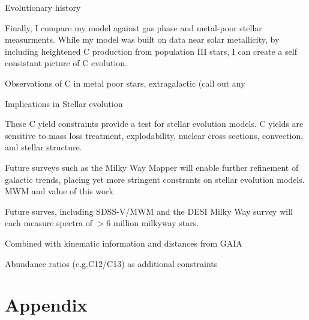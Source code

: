 \documentclass[12pt,oneside]{report}
\begin{document}
Evolutionary history

Finally, I compare my model against gas phase and metal-poor stellar measurments. While my model was built on data near solar metallicity, by including heightened C production from population III stars, I can create a self consistant picture of C evolution.

Observations of C in metal poor stars, extragalactic (call out any

Implications in Stellar evolution

These C yield constraints provide a test for stellar evolution models. C yields are sensitive to mass loss treatment, explodability, nuclear cross sections, convection, and stellar structure. 

Future surveys such as the Milky Way Mapper will enable further refinement of galactic trends, placing yet more stringent constrants on stellar evolution models.
MWM and value of this work

Future surves, including SDSS-V/MWM and the DESI Milky Way survey will each measure spectra of $>6$ million milkyway stars.
\citep{desi, desi:mw}

Combined with kinematic information and distances from GAIA \citep{gaia}

\citep{sdssv}
Abundance ratios (e.g.C12/C13) as additional constraints




\newpage






\appendix
\chapter*{Appendix}
\renewcommand{\thesection}{A.\arabic{section}}
\renewcommand\thefigure{A\arabic{figure}}    
\renewcommand\theequation{A\arabic{equation}}    
\setcounter{figure}{0}
\setcounter{equation}{0}
\end{document}
